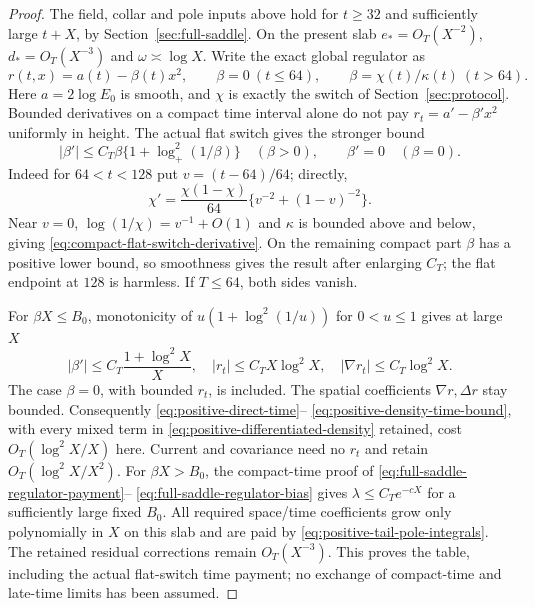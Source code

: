 \begin{proof}
The field, collar and pole inputs above hold for $t\ge32$ and
sufficiently large $t+X$, by Section~\ref{sec:full-saddle}.
On the present slab $e_*=O_T(X^{-2})$, $d_*=O_T(X^{-3})$ and
$\omega\asymp\log X$. Write the exact global regulator as
\begin{equation}
 r(t,x)=a(t)-\beta(t)x^2,\qquad
 \beta=0\ (t\le64),\qquad\beta=\chi(t)/\kappa(t)\ (t>64).
 \label{eq:compact-positive-regulator}
\end{equation}
Here $a=2\log E_0$ is smooth, and $\chi$ is exactly the switch of
Section~\ref{sec:protocol}. Bounded derivatives on a compact time
interval alone do not pay $r_t=a'-\beta'x^2$ uniformly in height.
The actual flat switch gives the stronger bound
\begin{equation}
 |\beta'|\le C_T\beta\{1+\log_+^2(1/\beta)\}\quad(\beta>0),
 \qquad \beta'=0\quad(\beta=0).
 \label{eq:compact-flat-switch-derivative}
\end{equation}
Indeed for $64<t<128$ put $v=(t-64)/64$; directly,
\[
 \chi'=\frac{\chi(1-\chi)}{64}
                          \{v^{-2}+(1-v)^{-2}\}.
\]
Near $v=0$, $\log(1/\chi)=v^{-1}+O(1)$ and $\kappa$ is bounded
above and below, giving \eqref{eq:compact-flat-switch-derivative}.
On the remaining compact part $\beta$ has a positive lower bound,
so smoothness gives the result after enlarging $C_T$; the flat endpoint
at $128$ is harmless. If $T\le64$, both sides vanish.

For $\beta X\le B_0$, monotonicity of
$u(1+\log^2(1/u))$ for $0<u\le1$ gives at large $X$
\begin{equation}
 |\beta'|\le C_T\frac{1+\log^2X}{X},\quad
 |r_t|\le C_TX\log^2X,\quad
 |\nabla r_t|\le C_T\log^2X.
 \label{eq:compact-positive-time-coefficients}
\end{equation}
The case $\beta=0$, with bounded $r_t$, is included.
The spatial coefficients $\nabla r,\Delta r$ stay bounded.
Consequently \eqref{eq:positive-direct-time}--
\eqref{eq:positive-density-time-bound}, with every mixed term in
\eqref{eq:positive-differentiated-density} retained, cost
$O_T(\log^2X/X)$ here. Current and covariance need no $r_t$ and
retain $O_T(\log^2X/X^2)$.
For $\beta X>B_0$, the compact-time proof of
\eqref{eq:full-saddle-regulator-payment}--
\eqref{eq:full-saddle-regulator-bias} gives
$\lambda\le C_Te^{-cX}$ for a sufficiently large fixed $B_0$.
All required space/time coefficients grow only polynomially in $X$
on this slab and are paid by \eqref{eq:positive-tail-pole-integrals}.
The retained residual corrections remain $O_T(X^{-3})$.
This proves the table, including the actual flat-switch time payment;
no exchange of compact-time and late-time limits has been assumed.
\end{proof}
